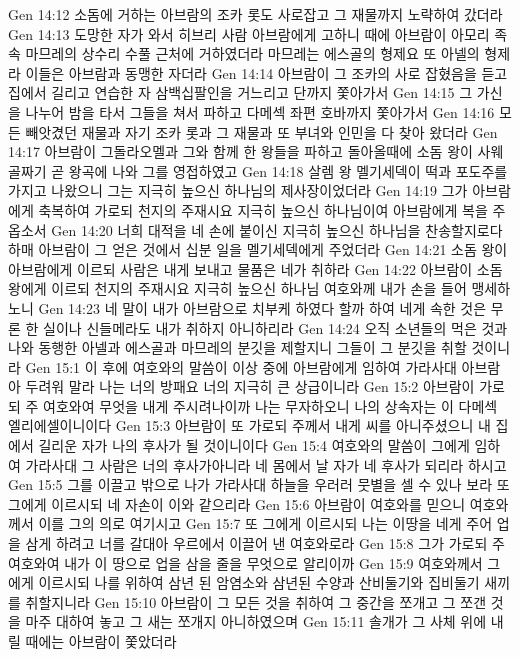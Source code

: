 Gen 14:12  소돔에 거하는 아브람의 조카 롯도 사로잡고 그 재물까지 노략하여 갔더라
Gen 14:13  도망한 자가 와서 히브리 사람 아브람에게 고하니 때에 아브람이 아모리 족속 마므레의 상수리 수풀 근처에 거하였더라 마므레는 에스골의 형제요 또 아넬의 형제라 이들은 아브람과 동맹한 자더라
Gen 14:14  아브람이 그 조카의 사로 잡혔음을 듣고 집에서 길리고 연습한 자 삼백십팔인을 거느리고 단까지 쫓아가서
Gen 14:15  그 가신을 나누어 밤을 타서 그들을 쳐서 파하고 다메섹 좌편 호바까지 쫓아가서
Gen 14:16  모든 빼앗겼던 재물과 자기 조카 롯과 그 재물과 또 부녀와 인민을 다 찾아 왔더라
Gen 14:17  아브람이 그돌라오멜과 그와 함께 한 왕들을 파하고 돌아올때에 소돔 왕이 사웨 골짜기 곧 왕곡에 나와 그를 영접하였고
Gen 14:18  살렘 왕 멜기세덱이 떡과 포도주를 가지고 나왔으니 그는 지극히 높으신 하나님의 제사장이었더라
Gen 14:19  그가 아브람에게 축복하여 가로되 천지의 주재시요 지극히 높으신 하나님이여 아브람에게 복을 주옵소서
Gen 14:20  너희 대적을 네 손에 붙이신 지극히 높으신 하나님을 찬송할지로다 하매 아브람이 그 얻은 것에서 십분 일을 멜기세덱에게 주었더라
Gen 14:21  소돔 왕이 아브람에게 이르되 사람은 내게 보내고 물품은 네가 취하라
Gen 14:22  아브람이 소돔 왕에게 이르되 천지의 주재시요 지극히 높으신 하나님 여호와께 내가 손을 들어 맹세하노니
Gen 14:23  네 말이 내가 아브람으로 치부케 하였다 할까 하여 네게 속한 것은 무론 한 실이나 신들메라도 내가 취하지 아니하리라
Gen 14:24  오직 소년들의 먹은 것과 나와 동행한 아넬과 에스골과 마므레의 분깃을 제할지니 그들이 그 분깃을 취할 것이니라
Gen 15:1  이 후에 여호와의 말씀이 이상 중에 아브람에게 임하여 가라사대 아브람아 두려워 말라 나는 너의 방패요 너의 지극히 큰 상급이니라
Gen 15:2  아브람이 가로되 주 여호와여 무엇을 내게 주시려나이까 나는 무자하오니 나의 상속자는 이 다메섹 엘리에셀이니이다
Gen 15:3  아브람이 또 가로되 주께서 내게 씨를 아니주셨으니 내 집에서 길리운 자가 나의 후사가 될 것이니이다
Gen 15:4  여호와의 말씀이 그에게 임하여 가라사대 그 사람은 너의 후사가아니라 네 몸에서 날 자가 네 후사가 되리라 하시고
Gen 15:5  그를 이끌고 밖으로 나가 가라사대 하늘을 우러러 뭇별을 셀 수 있나 보라 또 그에게 이르시되 네 자손이 이와 같으리라
Gen 15:6  아브람이 여호와를 믿으니 여호와께서 이를 그의 의로 여기시고
Gen 15:7  또 그에게 이르시되 나는 이땅을 네게 주어 업을 삼게 하려고 너를 갈대아 우르에서 이끌어 낸 여호와로라
Gen 15:8  그가 가로되 주 여호와여 내가 이 땅으로 업을 삼을 줄을 무엇으로 알리이까
Gen 15:9  여호와께서 그에게 이르시되 나를 위하여 삼년 된 암염소와 삼년된 수양과 산비둘기와 집비둘기 새끼를 취할지니라
Gen 15:10  아브람이 그 모든 것을 취하여 그 중간을 쪼개고 그 쪼갠 것을 마주 대하여 놓고 그 새는 쪼개지 아니하였으며
Gen 15:11  솔개가 그 사체 위에 내릴 때에는 아브람이 쫓았더라
